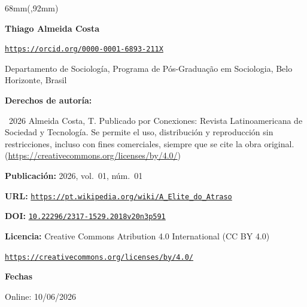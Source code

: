 \begin{textblock*}{68mm}(\gbbloquex,92mm)
{\setlength{\leftskip}{0pt}\setlength{\parindent}{0pt}%
\noindent\begin{minipage}[t]{68mm}
\sffamily\small\setlength{\parskip}{1pt}
{\bfseries\color{azulrevista}Thiago Almeida Costa}\par
{\scriptsize\texttt{\href{https://orcid.org/0000-0001-6893-211X}{https://orcid.org/0000-0001-6893-211X}}}\par
Departamento de Sociología, Programa de Pós-Graduação em Sociologia, Belo Horizonte, Brasil\par
\vspace{6pt}
{\bfseries\color{azulrevista!70}Derechos de autor\'ia:}\par
\textcopyright\ 2026 Almeida Costa, T. Publicado por Conexiones: Revista Latinoamericana de Sociedad y Tecnología. Se permite el uso, distribución y reproducción sin restricciones, incluso con fines comerciales, siempre que se cite la obra original. (\href{https://creativecommons.org/licenses/by/4.0/}{https://creativecommons.org/licenses/by/4.0/})\par\vspace{6pt}
{\bfseries\color{azulrevista!70}Publicación:} 2026, vol.~01, n\'um.~01\par\vspace{6pt}
{\bfseries\color{azulrevista!70}URL:} {\scriptsize\texttt{\href{https://pt.wikipedia.org/wiki/A_Elite_do_Atraso}{https://pt.wikipedia.org/wiki/A_Elite_do_Atraso}}}\par\vspace{6pt}
{\bfseries\color{azulrevista!70}DOI:} {\scriptsize\texttt{\href{https://doi.org/10.22296/2317-1529.2018v20n3p591}{10.22296/2317-1529.2018v20n3p591}}}\par\vspace{6pt}
{\bfseries\color{azulrevista!70}Licencia:} Creative Commons Atribution 4.0 International (CC BY 4.0)\par
{\scriptsize\texttt{\href{https://creativecommons.org/licenses/by/4.0/}{https://creativecommons.org/licenses/by/4.0/}}}\par
\vspace{6pt}
{\bfseries\color{azulrevista!70}Fechas}\par\vspace{2pt}
Online: 10/06/2026\par
\vspace{6pt}
\vspace{6pt}

\end{minipage}}
\end{textblock*}
